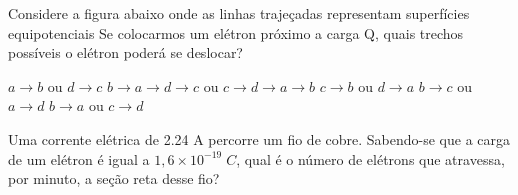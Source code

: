 \documentclass[12pt, addpoints]{exam}
\begin{document}
    \begin{questions}
\begin{multicols*}{2}
\question Considere a figura abaixo onde as linhas trajeçadas representam superfícies equipotenciais Se colocarmos um elétron próximo a carga Q, quais trechos possíveis o elétron poderá se deslocar?
        
        \begin{center}
            \begin{minipage}[c]{0.5\linewidth}
            \end{minipage}
        \end{center}
        
        

\begin{choices}
\choice $a\rightarrow b$ ou $d\rightarrow c$ 
\choice $b\rightarrow a\rightarrow d\rightarrow c$ ou $c\rightarrow d\rightarrow a\rightarrow b$ 
\choice $c\rightarrow b$ ou $d\rightarrow a$ 
\choice $b\rightarrow c$ ou $a\rightarrow d$ 
\choice $b\rightarrow a$ ou $c\rightarrow d$ 
\end{choices}
\question Uma corrente elétrica de    2.24 A percorre um ﬁo de cobre. Sabendo-se que a carga de um elétron é igual a $1,6\times 10^{-19}\;C$, qual é o número de elétrons que atravessa, por minuto, a seção reta desse ﬁo?


\end{multicols*}
\end{questions}
\end{document}

